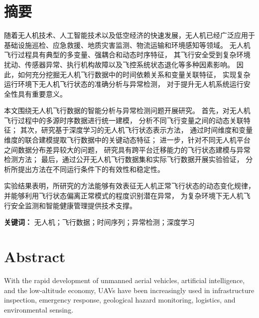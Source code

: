\documentclass[
  degree=master,
  degree-type=academic
]{gzuthesis}
\begin{document}

\frontmatter


\chapter*{摘\quad 要}

随着无人机技术、人工智能技术以及低空经济的快速发展，无人机已经广泛应用于
基础设施巡检、应急救援、地质灾害监测、物流运输和环境感知等领域。
无人机飞行过程具有典型的多变量、强耦合和动态时序特征，
其飞行安全受到复杂环境扰动、传感器异常、执行机构故障以及飞控系统状态退化等多种因素影响。
因此，如何充分挖掘无人机飞行数据中的时间依赖关系和变量关联特征，
实现复杂运行环境下无人机飞行状态的准确分析与异常检测，
对于提升无人机系统运行安全性具有重要意义。

本文围绕无人机飞行数据的智能分析与异常检测问题开展研究。
首先，对无人机飞行过程中的多源时序数据进行统一建模，
分析不同飞行变量之间的动态关联特征；
其次，研究基于深度学习的无人机飞行状态表示方法，
通过时间维度和变量维度的联合建模提取飞行数据中的关键动态特征；
进一步，针对不同无人机平台之间数据分布差异较大的问题，
研究具有跨平台迁移能力的飞行状态建模与异常检测方法；
最后，通过公开无人机飞行数据集和实际飞行数据开展实验验证，
分析所提出方法在不同运行条件下的有效性和稳定性。

实验结果表明，所研究的方法能够有效表征无人机正常飞行状态的动态变化规律，
并能够利用飞行状态偏离正常模式的程度识别潜在异常，
为复杂环境下无人机飞行安全监测和智能健康管理提供技术支撑。

\noindent
\textbf{关键词：}
无人机；飞行数据；时间序列；异常检测；深度学习



\chapter*{Abstract}

With the rapid development of unmanned aerial vehicles, artificial
intelligence, and the low-altitude economy, UAVs have been increasingly
used in infrastructure inspection, emergency response, geological hazard
monitoring, logistics, and environmental sensing.
\end{document}
